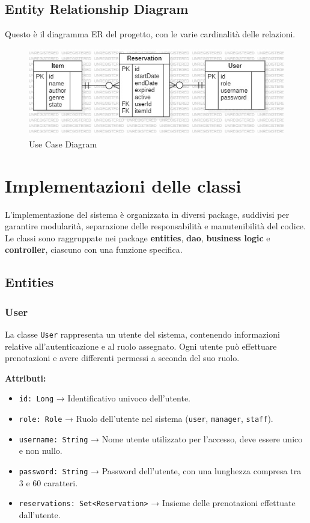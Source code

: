 \documentclass[twoside,openright,titlepage,fleqn,headinclude,12pt,a4paper,BCOR=5mm,footinclude]{scrbook}
\begin{document}
\section{Entity Relationship Diagram}
Questo è il diagramma ER del progetto, con le varie cardinalità delle
relazioni.

\begin{figure}[H]
  \centering
  \includegraphics[width=1\linewidth]{images/relationsDiag.jpg}
  \caption{Use Case Diagram}
  \label{fig:Use Case Diagram}
\end{figure}

\chapter{Implementazioni delle classi}

L’implementazione del sistema è organizzata in diversi package, suddivisi per garantire modularità, separazione delle responsabilità e manutenibilità del codice. Le classi sono raggruppate nei package \textbf{entities}, \textbf{dao}, \textbf{business logic} e \textbf{controller}, ciascuno con una funzione specifica.  

\section{Entities}


\subsection{User}
La classe \texttt{User} rappresenta un utente del sistema, contenendo informazioni relative all'autenticazione e al ruolo assegnato. Ogni utente può effettuare prenotazioni e avere differenti permessi a seconda del suo ruolo.

\textbf{Attributi:}  
\begin{itemize}  
    \item \texttt{id: Long} → Identificativo univoco dell’utente.  
    \item \texttt{role: Role} → Ruolo dell'utente nel sistema (\texttt{user}, \texttt{manager}, \texttt{staff}).  
    \item \texttt{username: String} → Nome utente utilizzato per l’accesso, deve essere unico e non nullo.  
    \item \texttt{password: String} → Password dell’utente, con una lunghezza compresa tra 3 e 60 caratteri.  
    \item \texttt{reservations: Set<Reservation>} → Insieme delle prenotazioni effettuate dall’utente.  
\end{itemize}  
\end{document}
